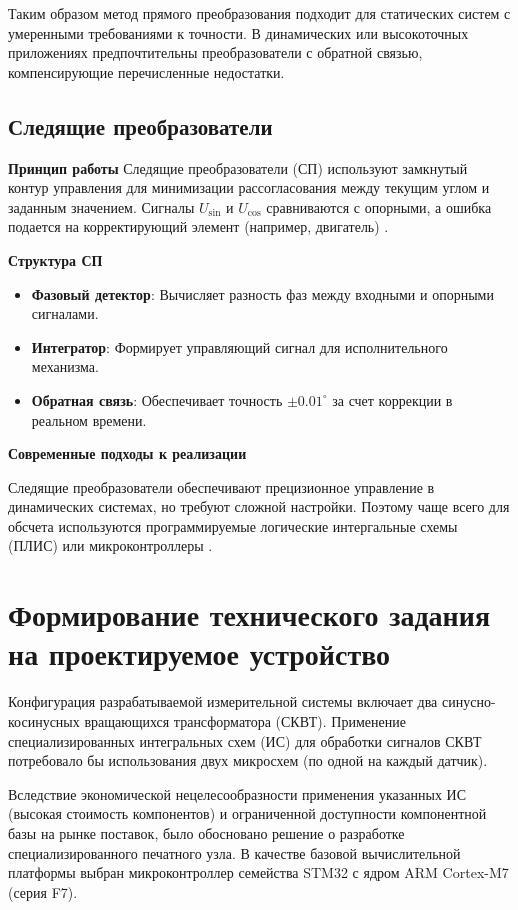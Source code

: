 Таким образом метод прямого преобразования подходит для статических систем с умеренными требованиями к точности. 
В динамических или высокоточных приложениях предпочтительны преобразователи с обратной связью, компенсирующие перечисленные недостатки.

\subsection{Следящие преобразователи}

\textbf{Принцип работы}
Следящие преобразователи (СП) используют замкнутый контур управления для минимизации рассогласования между текущим углом и заданным значением. 
Сигналы \(U_{\sin}\) и \(U_{\cos}\) сравниваются с опорными, а ошибка подается на корректирующий элемент (например, двигатель) \cite{Anufriev2014} \cite{Safronov}.

\textbf{Структура СП}
\begin{itemize}
    \item \textbf{Фазовый детектор}: Вычисляет разность фаз между входными и опорными сигналами.
    \item \textbf{Интегратор}: Формирует управляющий сигнал для исполнительного механизма.
    \item \textbf{Обратная связь}: Обеспечивает точность \(\pm0.01^\circ\) за счет коррекции в реальном времени.
\end{itemize}

\textbf{Современные подходы к реализации}

Следящие преобразователи обеспечивают прецизионное управление в динамических системах, но требуют сложной настройки.
Поэтому чаще всего для обсчета используются программируемые логические интергальные схемы (ПЛИС) или микроконтроллеры \cite{MilandrSKVT}.

\section{Формирование технического задания на проектируемое устройство}

Конфигурация разрабатываемой измерительной системы включает два синусно-косинусных вращающихся трансформатора (СКВТ). 
Применение специализированных интегральных схем (ИС) для обработки сигналов СКВТ потребовало бы использования двух микросхем (по одной на каждый датчик). 

Вследствие экономической нецелесообразности применения указанных ИС (высокая стоимость компонентов) и ограниченной доступности компонентной базы 
на рынке поставок, было обосновано решение о разработке специализированного печатного узла. В качестве базовой вычислительной платформы выбран микроконтроллер 
семейства STM32 с ядром ARM Cortex-M7 (серия F7).

